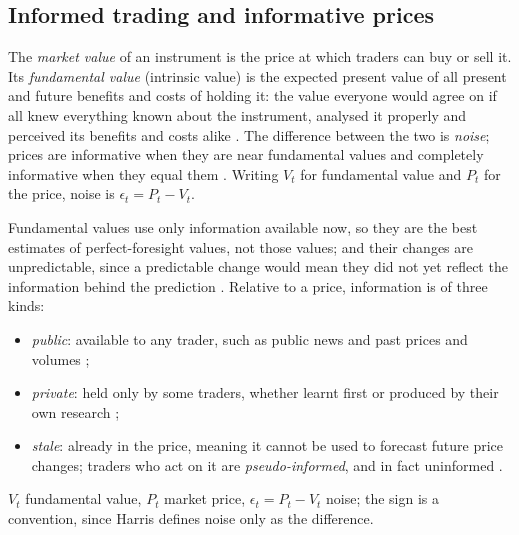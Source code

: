 \subsection{Informed trading and informative prices}

\begin{qfdefinition}\label{def:fundamental-value}
 The \emph{market value} of an instrument is the price at which traders can buy or sell it. Its \emph{fundamental value} (intrinsic value) is the expected present value of all present and future benefits and costs of holding it: the value everyone would agree on if all knew everything known about the instrument, analysed it properly and perceived its benefits and costs alike \citep[chap.~``Informed Traders and Market Efficiency'', sec.~10.1, pp.~222--223]{alpha-harris}. The difference between the two is \emph{noise}; prices are informative when they are near fundamental values and completely informative when they equal them \citep[same sec., p.~223]{alpha-harris}. Writing $V_t$ for fundamental value and $P_t$ for the price, noise is $\epsilon_t=P_t-V_t$.

Fundamental values use only information available now, so they are the best estimates of perfect-foresight values, not those values; and their changes are unpredictable, since a predictable change would mean they did not yet reflect the information behind the prediction \citep[same sec., p.~223]{alpha-harris}. Relative to a price, information is of three kinds:
\begin{itemize}
\item \emph{public}: available to any trader, such as public news and past prices and volumes \citep[same chap., pp.~223 and~240]{alpha-harris};
\item \emph{private}: held only by some traders, whether learnt first or produced by their own research \citep[same chap., pp.~223 and~228]{alpha-harris};
\item \emph{stale}: already in the price, meaning it cannot be used to forecast future price changes; traders who act on it are \emph{pseudo-informed}, and in fact uninformed \citep[same chap., sec.~10.5.2.1, p.~229]{alpha-harris}.
\end{itemize}

 $V_t$ fundamental value, $P_t$ market price, $\epsilon_t=P_t-V_t$ noise; the sign is a convention, since Harris defines noise only as the difference.


\end{qfdefinition}
